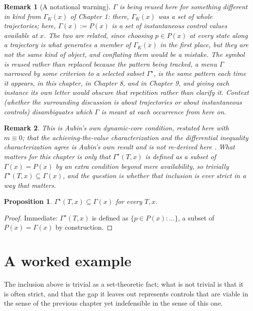\documentclass[11pt]{report}
\newtheorem{proposition}{Proposition}[chapter]
\newtheorem{remark}{Remark}[chapter]
\begin{document}
\begin{remark}[A notational warning]
$\Gamma$ is being reused here for something different in kind from
$\Gamma_K(x)$ of Chapter 1: there, $\Gamma_K(x)$ was a set of whole
trajectories; here, $\Gamma(x) := P(x)$ is a set of instantaneous
control values available at $x$. The two are related, since choosing
$p \in P(x)$ at every state along a trajectory is what generates a
member of $\Gamma_K(x)$ in the first place, but they are not the same
kind of object, and conflating them would be a mistake. The symbol is
reused rather than replaced because the pattern being tracked, a menu
$\Gamma$ narrowed by some criterion to a selected subset $\Gamma^\star$,
is the same pattern each time it appears, in this chapter, in
Chapter 8, and in Chapter 9, and giving each instance its own letter
would obscure that repetition rather than clarify it. Context (whether
the surrounding discussion is about trajectories or about
instantaneous controls) disambiguates which $\Gamma$ is meant at each
occurrence from here on.
\end{remark}

\begin{remark}
This is Aubin's own dynamic-core condition, restated here with $m\equiv
0$; that the achieving-the-value characterization and the differential
inequality characterization agree is Aubin's own result and is not
re-derived here \cite{aubin2001}. What matters for this chapter is only
that $\Gamma^\star(T,x)$ is defined as a subset of $\Gamma(x) = P(x)$ by
an extra condition beyond mere availability, so trivially
$\Gamma^\star(T,x) \subseteq \Gamma(x)$, and the question is whether
that inclusion is ever strict in a way that matters.
\end{remark}

\begin{proposition}
$\Gamma^\star(T,x) \subseteq \Gamma(x)$ for every $T, x$.
\end{proposition}
\begin{proof}
Immediate: $\Gamma^\star(T,x)$ is defined as $\{p \in P(x) : \dots\}$, a
subset of $P(x) = \Gamma(x)$ by construction.
\end{proof}

\section*{A worked example}

The inclusion above is trivial as a set-theoretic fact; what is not
trivial is that it is often strict, and that the gap it leaves out
represents controls that are viable in the sense of the previous
chapter yet indefensible in the sense of this one.
\end{document}
